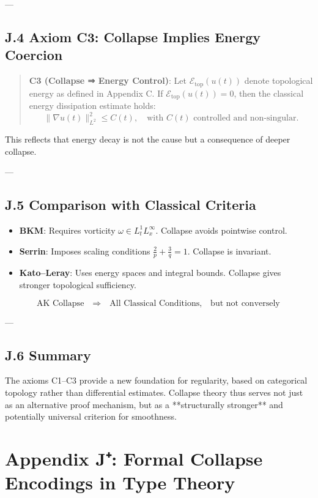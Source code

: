 ---

\subsection*{J.4 Axiom C3: Collapse Implies Energy Coercion}

\begin{quote}
\textbf{C3 (Collapse ⇒ Energy Control)}:  
Let \( \mathcal{E}_{\text{top}}(u(t)) \) denote topological energy as defined in Appendix C.  
If \( \mathcal{E}_{\text{top}}(u(t)) = 0 \), then the classical energy dissipation estimate holds:
\[
\|\nabla u(t)\|_{L^2}^2 \leq C(t), \quad \text{with } C(t) \text{ controlled and non-singular}.
\]
\end{quote}

This reflects that energy decay is not the cause but a consequence of deeper collapse.

---

\subsection*{J.5 Comparison with Classical Criteria}

\begin{itemize}
  \item \textbf{BKM}: Requires vorticity \( \omega \in L^1_t L^\infty_x \). Collapse avoids pointwise control.
  \item \textbf{Serrin}: Imposes scaling conditions \( \frac{2}{p} + \frac{3}{q} = 1 \). Collapse is invariant.
  \item \textbf{Kato–Leray}: Uses energy spaces and integral bounds. Collapse gives stronger topological sufficiency.
\end{itemize}

\[
\boxed{
\text{AK Collapse} \quad \textbf{⇒} \quad \text{All Classical Conditions},
\quad \text{but not conversely}
}
\]

---

\subsection*{J.6 Summary}

The axioms C1–C3 provide a new foundation for regularity, based on  
categorical topology rather than differential estimates.  
Collapse theory thus serves not just as an alternative proof mechanism,  
but as a **structurally stronger** and potentially universal criterion for smoothness.


\section*{Appendix J⁺: Formal Collapse Encodings in Type Theory}

